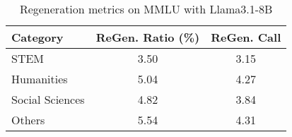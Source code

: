 \begingroup
\renewcommand{\arraystretch}{1.1}
\begin{table}[t]
    \caption{Regeneration metrics on MMLU with Llama3.1-8B}
    \label{tab:regeneration_metric_mmlu}
    \centering
    \footnotesize
    \begin{tabular}{L{0.14}C{0.18}C{0.16}}
        \toprule
        \textbf{Category} & \textbf{ReGen. Ratio (\%)} & \textbf{ReGen. Call} \\
        \midrule
        STEM              & 3.50                      & 3.15                   \\
        Humanities        & 5.04                      & 4.27                   \\
        Social Sciences   & 4.82                      & 3.84                   \\
        Others            & 5.54                      & 4.31                   \\
        \bottomrule
    \end{tabular}
\end{table}
\endgroup

